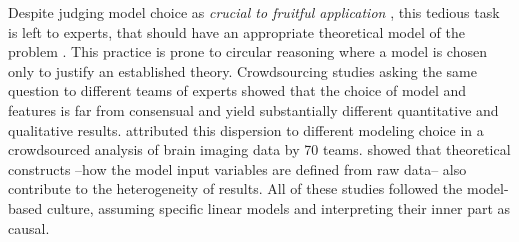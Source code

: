 \documentclass[french,12pt,twoside,a4paper]{book}
\begin{document}
Despite judging model choice as \textit{crucial to fruitful application}
\citep{cox2006principles}, this tedious task is left to experts, that should have an
appropriate theoretical model of the problem \citep{cox2001statistical}. This
practice is prone to circular reasoning where a model is chosen only to justify an
established theory. Crowdsourcing studies asking the same question to
different teams of experts showed that the choice of model and features is far
from consensual and yield substantially different quantitative and qualitative
results. \cite{botvinik2020variability} attributed this dispersion to different
modeling choice in a crowdsourced analysis of brain imaging data by 70 teams.
\cite{schweinsberg2021same} showed that theoretical constructs --how the
model input variables are defined from raw data-- also contribute to the heterogeneity of results.
All of these studies followed the model-based culture, assuming specific linear
models and interpreting their inner part as causal.

\end{document}
